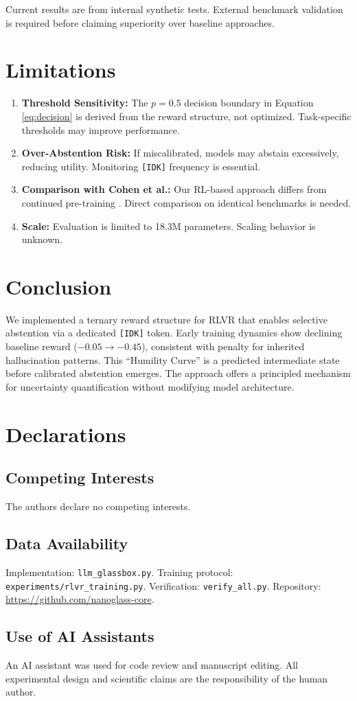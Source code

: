 \documentclass{article}
\begin{document}
Current results are from internal synthetic tests. External benchmark validation is required before claiming superiority over baseline approaches.

\section{Limitations}
\begin{enumerate}
    \item \textbf{Threshold Sensitivity:} The $p=0.5$ decision boundary in Equation \ref{eq:decision} is derived from the reward structure, not optimized. Task-specific thresholds may improve performance.
    \item \textbf{Over-Abstention Risk:} If miscalibrated, models may abstain excessively, reducing utility. Monitoring \texttt{[IDK]} frequency is essential.
    \item \textbf{Comparison with Cohen et al.:} Our RL-based approach differs from continued pre-training \cite{Cohen2024IDK}. Direct comparison on identical benchmarks is needed.
    \item \textbf{Scale:} Evaluation is limited to 18.3M parameters. Scaling behavior is unknown.
\end{enumerate}

\section{Conclusion}
We implemented a ternary reward structure for RLVR that enables selective abstention via a dedicated \texttt{[IDK]} token. Early training dynamics show declining baseline reward ($-0.05 \rightarrow -0.45$), consistent with penalty for inherited hallucination patterns. This ``Humility Curve'' is a predicted intermediate state before calibrated abstention emerges. The approach offers a principled mechanism for uncertainty quantification without modifying model architecture.

\section*{Declarations}

\subsection*{Competing Interests}
The authors declare no competing interests.

\subsection*{Data Availability}
Implementation: \texttt{llm\_glassbox.py}. Training protocol: \texttt{experiments/rlvr\_training.py}. Verification: \texttt{verify\_all.py}. Repository: \url{https://github.com/nanoglass-core}.

\subsection*{Use of AI Assistants}
An AI assistant was used for code review and manuscript editing. All experimental design and scientific claims are the responsibility of the human author.

\printbibliography
\end{document}
